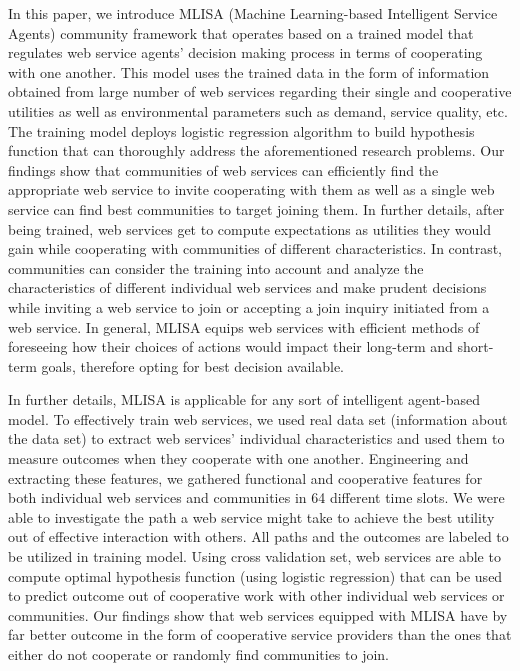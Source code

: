 \documentclass[10pt,journal,cspaper,compsoc]{IEEEtran}
\begin{document}
In this paper, we introduce MLISA (Machine Learning-based Intelligent Service Agents) community framework that operates based on a trained model that regulates web service agents' decision making process in terms of cooperating with one another. This model uses the trained data in the form of information obtained from large number of web services regarding their single and cooperative utilities as well as environmental parameters such as demand, service quality, etc. The training model deploys logistic regression algorithm to build hypothesis function that can thoroughly address the aforementioned research problems. Our findings show that communities of web services can efficiently find the appropriate web service to invite cooperating with them as well as a single web service can find best communities to target joining them. In further details, after being trained, web services get to compute expectations as utilities they would gain while cooperating with communities of different characteristics. In contrast, communities can consider the training into account and analyze the characteristics of different individual web services and make prudent decisions while inviting a web service to join or accepting a join inquiry initiated from a web service. In general, MLISA equips web services with efficient methods of foreseeing how their choices of actions would impact their long-term and short-term goals, therefore opting for best decision available. 

In further details, MLISA is applicable for any sort of intelligent agent-based model. To effectively train web services, we used real data set (information about the data set) to extract web services' individual characteristics and used them to measure outcomes when they cooperate with one another. Engineering and extracting these features, we gathered functional and cooperative features for both individual web services and communities in 64 different time slots. We were able to investigate the path a web service might take to achieve the best utility out of effective interaction with others. All paths and the outcomes are labeled to be utilized in training model. Using cross validation set, web services are able to compute optimal hypothesis function (using logistic regression) that can be used to predict outcome out of cooperative work with other individual web services or communities. Our findings show that web services equipped with MLISA have by far better outcome in the form of cooperative service providers than the ones that either do not cooperate or randomly find communities to join. 
\end{document}
